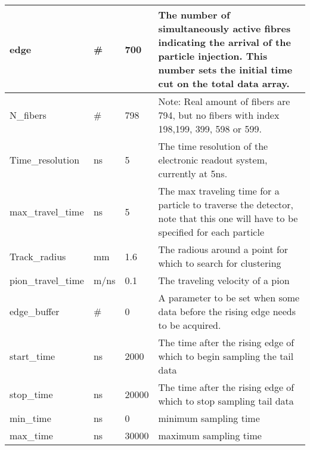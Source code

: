 \documentclass[article,9pt,oneside]{article}
\begin{document}
\begin{center}
\begin{tabular}{|p{4cm}|p{1.5cm}|p{3cm}|p{8cm}|}
		  edge &\#& 700 & The number of simultaneously active fibres indicating the arrival of the particle injection. This number sets the initial time cut on the total data array. \\ \hline
		  N\_fibers&\#& 798& Note: Real amount of fibers are 794, but no fibers with index 198,199, 399, 598 or 599. \\ \hline
		  Time\_resolution&ns& 5& The time resolution of the electronic readout system, currently at 5ns.  \\ \hline
		  max\_travel\_time &ns&5& The max traveling time for a particle to traverse the detector, note that this one will have to be specified for each particle\\ \hline 
		  Track\_radius&mm&1.6& The radious around a point for which to search for clustering \\ \hline
		  pion\_travel\_time &m/ns&0.1& The traveling velocity of a pion\\ \hline
		  edge\_buffer &\#&0& A parameter to be set when some data before the rising edge needs to be acquired.  \\ \hline
		  start\_time&ns&2000& The time after the rising edge of which to begin sampling the tail data \\ \hline
		  stop\_time&ns&20000& The time after the rising edge of which to stop sampling tail data\\ \hline
		  min\_time&ns&0& minimum sampling time\\ \hline
		  max\_time&ns&30000& maximum sampling time\\ \hline
	\end{tabular}
\end{center}
\end{document}
